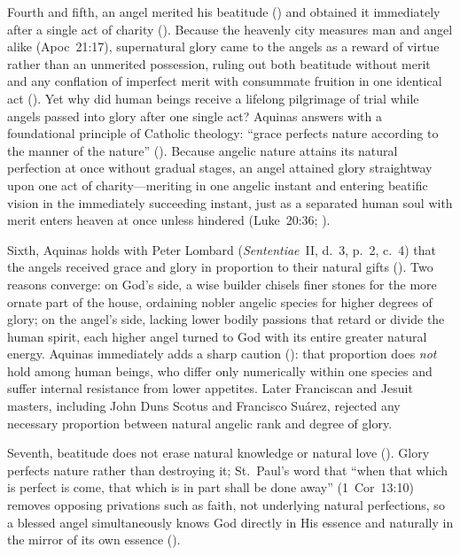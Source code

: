 Fourth and fifth, an angel merited his beatitude () and obtained it immediately after a single act of charity (). Because the heavenly city measures man and angel alike (Apoc~21:17), supernatural glory came to the angels as a reward of virtue rather than an unmerited possession, ruling out both beatitude without merit and any conflation of imperfect merit with consummate fruition in one identical act (). Yet why did human beings receive a lifelong pilgrimage of trial while angels passed into glory after one single act? Aquinas answers with a foundational principle of Catholic theology: ``grace perfects nature according to the manner of the nature'' (). Because angelic nature attains its natural perfection at once without gradual stages, an angel attained glory straightway upon one act of charity---meriting in one angelic instant and entering beatific vision in the immediately succeeding instant, just as a separated human soul with merit enters heaven at once unless hindered (Luke~20:36; ).

Sixth, Aquinas holds with Peter Lombard (\emph{Sententiae}~II, d.~3, p.~2, c.~4) that the angels received grace and glory in proportion to their natural gifts (). Two reasons converge: on God's side, a wise builder chisels finer stones for the more ornate part of the house, ordaining nobler angelic species for higher degrees of glory; on the angel's side, lacking lower bodily passions that retard or divide the human spirit, each higher angel turned to God with its entire greater natural energy. Aquinas immediately adds a sharp caution (): that proportion does \emph{not} hold among human beings, who differ only numerically within one species and suffer internal resistance from lower appetites. Later Franciscan and Jesuit masters, including John Duns Scotus and Francisco Su\'arez, rejected any necessary proportion between natural angelic rank and degree of glory.

Seventh, beatitude does not erase natural knowledge or natural love (). Glory perfects nature rather than destroying it; St.~Paul's word that ``when that which is perfect is come, that which is in part shall be done away'' (1~Cor~13:10) removes opposing privations such as faith, not underlying natural perfections, so a blessed angel simultaneously knows God directly in His essence and naturally in the mirror of its own essence ().

